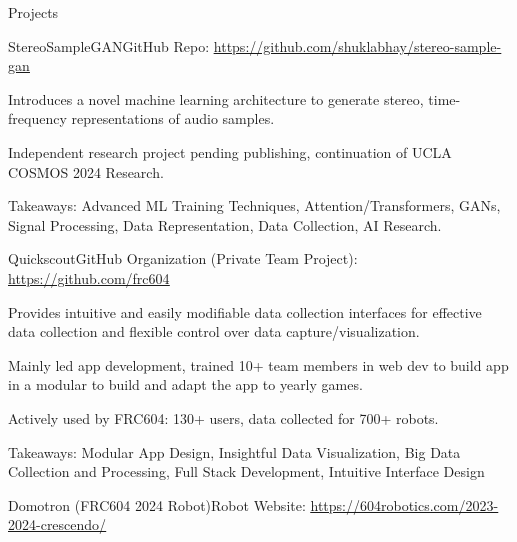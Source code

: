 \documentclass[
  11pt, %
]{public/resume/resume} %
\begin{document}
\begin{rSection}{Projects}

  
  \begin{rSubsection}{StereoSampleGAN}{}{GitHub Repo: \underline{\href{https://github.com/shuklabhay/stereo-sample-gan}{https://github.com/shuklabhay/stereo-sample-gan}}}{}
       
    \item Introduces a novel machine learning architecture to generate stereo, time-frequency representations of audio samples.
        
    \item Independent research project pending publishing, continuation of UCLA COSMOS 2024 Research.
        
    \item Takeaways: Advanced ML Training Techniques, Attention/Transformers, GANs, Signal Processing, Data Representation, Data Collection, AI Research.
        
  \end{rSubsection}
      
  \begin{rSubsection}{Quickscout}{}{GitHub Organization (Private Team Project): \underline{\href{https://github.com/frc604}{https://github.com/frc604}}}{}
       
    \item Provides intuitive and easily modifiable data collection interfaces for effective data collection and flexible control over data capture/visualization.
        
    \item Mainly led app development, trained 10+ team members in web dev to build app in a modular to build and adapt the app to yearly games.
        
    \item Actively used by FRC604: 130+ users, data collected for 700+ robots.
        
    \item Takeaways: Modular App Design, Insightful Data Visualization, Big Data Collection and Processing, Full Stack Development, Intuitive Interface Design
        
  \end{rSubsection}
      
  \begin{rSubsection}{Domotron (FRC604 2024 Robot)}{}{Robot Website: \underline{\href{https://604robotics.com/2023-2024-crescendo/}{https://604robotics.com/2023-2024-crescendo/}}}{}
       

\end{rSubsection}
\end{rSection}
\end{document}

